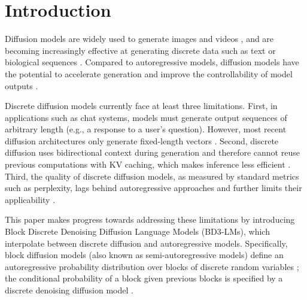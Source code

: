 \documentclass{article} %
\def\algofull{Block Discrete Denoising Diffusion Language Models}
\def\algos{BD3-LMs}
\begin{document}
\section{Introduction}
Diffusion models are widely used to generate images \citep{ho2020denoising,dhariwal2021diffusionmodelsbeatgans,sahoo2024diffusion} and videos \citep{ho2022video,gupta2023photorealisticvideogenerationdiffusion}, and are becoming increasingly effective at generating discrete data such as text \citep{lou2024discrete, sahoo2024simple} or biological sequences \citep{avdeyev2023dirichlet, goel2024memdlm}. Compared to autoregressive models, diffusion models have the potential to accelerate generation and improve the controllability of model outputs \citep{schiff2024discreteguidance, nisonoff2024unlocking, li2024derivative,sahoo2024zeroorder}.

Discrete diffusion models currently face at least three limitations. First, in applications such as chat systems, models must generate output sequences of arbitrary length (e.g., a response to a user's question). However, most recent diffusion architectures only generate fixed-length vectors \citep{austin2021structured,lou2024discrete}. Second, discrete diffusion uses bidirectional context during generation and therefore cannot reuse previous computations with KV caching, which makes inference less efficient \citep{israel2025enabling}. Third, the quality of discrete diffusion models, as measured by standard metrics such as perplexity, lags behind autoregressive approaches and further limits their applicability \citep{gulrajani2024plaid,sahoo2024simple}.

This paper makes progress towards addressing these limitations by introducing \algofull{} (\algos{}), which interpolate between discrete diffusion and autoregressive models. Specifically, block diffusion models (also known as semi-autoregressive models) define an autoregressive probability distribution over blocks of discrete random variables \citep{siautoregressive,si2023semi}; the conditional probability of a block given previous blocks is specified by a discrete denoising diffusion model \citep{austin2021structured,sahoo2024simple}.

\end{document}
